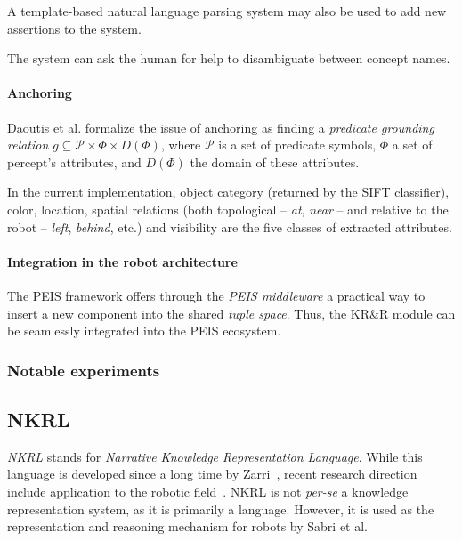 A template-based natural language parsing system may also be used to add new
assertions to the system.

The system can ask the human for help to disambiguate between concept names.

\paragraph{Anchoring} Daoutis et al. formalize the issue of anchoring as
finding a \emph{predicate grounding relation} $g \subseteq \mathcal{P} \times
\Phi \times D(\Phi)$, where $\mathcal{P}$ is a set of predicate symbols, $\Phi$
a set of percept's attributes, and $D(\Phi)$ the domain of these attributes.

In the current implementation, object category (returned by the SIFT
classifier), color, location, spatial relations (both topological -- \emph{at},
\emph{near} -- and relative to the robot -- \emph{left}, \emph{behind}, etc.)
and visibility are the five classes of extracted attributes.

\paragraph{Integration in the robot architecture}
\label{sect|peis-integration}

The PEIS framework offers through the \emph{PEIS middleware} a practical way to
insert a new component into the shared \emph{tuple space}.  Thus, the KR\&R
module can be seamlessly integrated into the PEIS ecosystem.

\subsubsection{Notable experiments}
\label{sect|peis-expe}

\subsection{NKRL}
\label{sect|nkrl}

\emph{NKRL} stands for \emph{Narrative Knowledge Representation Language}.
While this language is developed since a long time by Zarri~\cite{Zarri1997,
Zarri2008}, recent research direction include application to the robotic
field~\cite{Sabri2011}. NKRL is not {\it per-se} a knowledge representation
system, as it is primarily a language. However, it is used as the
representation and reasoning mechanism for robots by Sabri et al.

